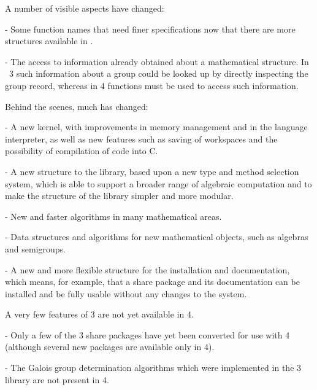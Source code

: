 A number of visible aspects have changed:

\beginlist
  \item{-}
    Some function names that need finer specifications now that there are
    more structures available in {\GAP}.

  \item{-}  
    The    access to information   already  obtained about a mathematical
    structure. In {\GAP}~3 such information about a group could be looked
    up  by  directly inspecting  the  group record,  whereas in  {\GAP} 4
    functions must be used to access such information.
\endlist

Behind the scenes, much has changed: 

\beginlist
  \item{-} A new kernel,  with improvements in  memory management  and in
  the language interpreter, as well  as new  features  such as saving  of
  workspaces and the possibility of compilation of {\GAP} code into C.

  \item{-} A new structure   to the library, based  upon  a new  type and
  method  selection system, which  is able to  support a broader range of
  algebraic computation and to make the  structure of the library simpler
  and more modular.

  \item{-}
    New and faster algorithms in many mathematical areas.

  \item{-} 
    Data structures and algorithms for new mathematical objects, such as
    algebras and semigroups.

  \item{-} A new and more flexible structure  for the {\GAP} installation
  and documentation, which  means, for example, that  a share package and
  its documentation can be installed and be fully usable without any changes
  to the {\GAP} system.
\endlist

A very few features of {\GAP} 3 are not yet available in  {\GAP} 4.

\beginlist
   \item{-}
     Only a few of the {\GAP} 3 share packages have yet been converted
     for use with  {\GAP} 4 (although several new packages are available
     only in  {\GAP} 4). 

   \item{-} The Galois group determination algorithms which were
      implemented in the {\GAP} 3 library are not present in {\GAP} 4.
    
